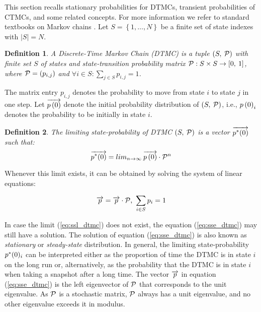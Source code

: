 \documentclass[times, 10pt,twocolumn]{article}
\newtheorem{definition}{Definition}
\begin{document}
		This section recalls stationary probabilities for DTMCs, transient probabilities of CTMCs, and some related concepts.   For more information we refer to standard textbooks on Markov chains \cite{Tijms_03, Haverkort_98}.  Let $S = \left\{1, \ldots,N \right\}$ be a finite set of state indexes with $|S|=N$.
	

		\begin{definition}
		A Discrete-Time Markov Chain (\emph{DTMC}) is a tuple $\left( S,\: \mathcal{P} \right)$ with finite set $S$ of states and state-transition probability matrix $\mathcal{P} : S \times S \rightarrow \left[0,\:1 \right]$, where $\mathcal{P}=\left(p_{i,j}\right)$ and $\forall i \in S : \sum_{j \in S} p_{i,j}=1$.
		\end{definition}
		
		The matrix entry $p_{i,j}$ denotes the probability to move from state $i$ to state $j$ in one step.  Let $\overrightarrow{p \left( 0 \right)}$ denote the initial probability distribution of $\left( S,\: \mathcal{P} \right)$, i.e., $p\left( 0 \right)_{i}$ denotes the probability to be initially in state $i$.

		\begin{definition}
		The \emph{limiting} state-probability of  DTMC $\left( S,\: \mathcal{P} \right)$ is a vector $\overrightarrow{p^{*}(0)}$ such that:
			\begin{equation}
				\overrightarrow{p^{*}(0)} = lim_{n \to \infty} \: \overrightarrow{p \left( 0 \right)} \cdot \mathcal{P}^{n}
				\label{eq:ssl_dtmc}
			\end{equation}
		\end{definition}
		
		Whenever this limit exists, it can be obtained by solving the system of linear equations:
		
		\begin{equation}
			\overrightarrow{p} = \overrightarrow{p} \cdot \mathcal{P} \text{, }\sum_{i \in S} p_{i} = 1
			\label{eq:sse_dtmc}
		\end{equation}
				
		In case the limit (\ref{eq:ssl_dtmc}) does not exist, the equation (\ref{eq:sse_dtmc}) may still have a solution.  The solution of equation (\ref{eq:sse_dtmc}) is also known as \emph{stationary} or \emph{steady-state} distribution.	
		In general, the limiting state-probability $p^{*}(0)_{i}$ can be interpreted either as the proportion of time the DTMC is in state $i$ on the long run or, alternatively, as the probability that the DTMC is in state $i$ when taking a snapshot after a long time.  The vector $\overrightarrow{p}$ in equation (\ref{eq:sse_dtmc}) is the left eigenvector of $\mathcal{P}$ that corresponds to the unit eigenvalue.  As $\mathcal{P}$ is a stochastic matrix, $\mathcal{P}$ always has a unit eigenvalue, and no other eigenvalue exceeds it in modulus.
		
\end{document}
